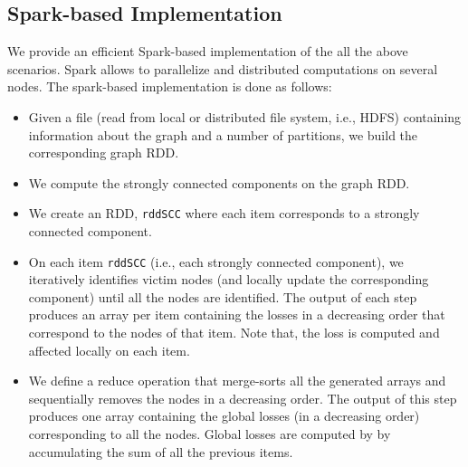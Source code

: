 \subsection{Spark-based Implementation}
We provide an efficient Spark-based implementation of the all the above scenarios. Spark allows to parallelize and distributed computations on several nodes. 
%
%
The spark-based implementation is done as follows:
\begin{itemize}
\item Given a file (read from local or distributed file system, i.e., HDFS) containing information about the graph and a number of partitions, we build the corresponding graph RDD. 
\item We compute the strongly connected components on the graph RDD. 
\item We create an RDD, \texttt{rddSCC} where each item corresponds to a strongly connected component. 
\item On each item \texttt{rddSCC} (i.e., each strongly connected component), we iteratively identifies victim nodes (and locally update the corresponding component) until all the nodes are identified. The output of each step produces an array per item containing the losses in a decreasing order that correspond to the nodes of that item. Note that, the loss is computed and affected locally on each item. 
\item We define a reduce operation that merge-sorts all the generated arrays and sequentially removes the nodes in a decreasing order. The output of this step produces one array containing the global losses (in a decreasing order) corresponding to all the nodes. Global losses are computed by by accumulating the sum of all the previous items. 
\end{itemize}




